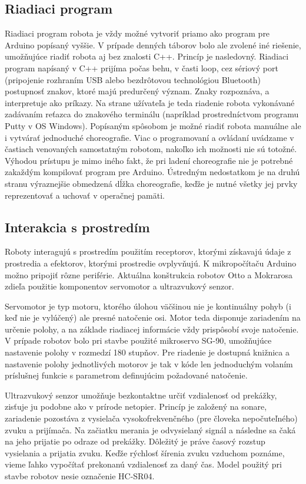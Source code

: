 \subsection{Riadiaci program}
Riadiaci program robota je vždy možné vytvoriť priamo ako program pre Arduino popísaný vyššie. V prípade denných táborov bolo ale zvolené iné riešenie, umožňujúce riadiť robota aj bez znalosti C++. Princíp je nasledovný. Riadiaci program napísaný v C++ prijíma počas behu, v časti loop, cez sériový port (pripojenie rozhraním USB alebo bezdrôtovou technológiou Bluetooth) postupnosť znakov, ktoré majú predurčený význam. Znaky rozpoznáva, a interpretuje ako príkazy. Na strane užívateľa je teda riadenie robota vykonávané zadávaním reťazca do znakového terminálu (napríklad prostredníctvom programu Putty v OS Windows). Popísaným spôsobom je možné riadiť robota manuálne ale i vytvárať jednoduché choreografie. Viac o programovaní a ovládaní uvádzame v častiach venovaných samostatným robotom, nakoľko ich možnosti nie sú totožné. Výhodou prístupu je mimo iného fakt, že pri ladení choreografie nie je potrebné zakaždým kompilovať program pre Arduino. Ústredným nedostatkom je na druhú stranu výraznejšie obmedzená dĺžka choreografie, keďže je nutné všetky jej prvky reprezentovať a uchovať v operačnej pamäti.

\subsection{Interakcia s prostredím}
Roboty interagujú s prostredím použitím receptorov, ktorými získavajú údaje z prostredia a efektorov, ktorými prostredie ovplyvňujú. K mikropočítaču Arduino možno pripojiť rôzne periférie. Aktuálna konštrukcia robotov Otto a Mokrarosa zdieľa použitie komponentov servomotor a ultrazvukový senzor.

Servomotor je typ motoru, ktorého úlohou väčšinou nie je kontinuálny pohyb (i keď nie je vylúčený) ale presné natočenie osi. Motor teda disponuje zariadením na určenie polohy, a na základe riadiacej informácie vždy prispôsobí svoje natočenie. V prípade robotov bolo pri stavbe použité mikroservo SG-90, umožňujúce nastavenie polohy v rozmedzí 180 stupňov. Pre riadenie je dostupná knižnica a nastavenie polohy jednotlivých motorov je tak v kóde len jednoduchým volaním príslušnej funkcie s parametrom definujúcim požadované natočenie.

Ultrazvukový senzor umožňuje bezkontaktne určiť vzdialenosť od prekážky, zisťuje ju podobne ako v prírode netopier. Princíp je založený na sonare, zariadenie pozostáva z vysielača vysokofrekvenčného (pre človeka nepočuteľného) zvuku a prijímača. Na začiatku merania je odvysielaný signál a následne sa čaká na jeho prijatie po odraze od prekážky. Dôležitý je práve časový rozstup vysielania a prijatia  zvuku. Keďže rýchlosť šírenia zvuku vzduchom poznáme, vieme ľahko vypočítať prekonanú vzdialenosť za daný čas. Model použitý pri stavbe robotov nesie označenie HC-SR04.


